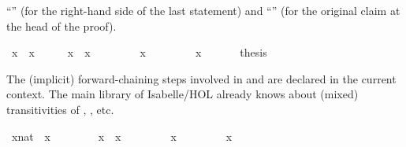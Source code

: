 \begin{isabellebody}
\begin{isamarkuptext}
  ``\isa{{\isasymdots}}'' (for the right-hand side of the last statement) and
  ``'' (for the original claim at the head of the
  proof).%
\end{isamarkuptext}%
\isamarkuptrue%
\ {\isachardoublequote}x{}\ {\isacharequal}\ x{}{\isachardoublequote}\isanewline
\isamarkupfalse%
\ {\isacharminus}\isanewline
\ \ \isamarkupfalse%
\ {\isachardoublequote}x{}\ {\isacharequal}\ x{}{\isachardoublequote}\ \isamarkupfalse%
\isanewline
\ \ \isamarkupfalse%
\ \isamarkupfalse%
\ {\isachardoublequote}{\isasymdots}\ {\isacharequal}\ x{}{\isachardoublequote}\ \isamarkupfalse%
\isanewline
\ \ \isamarkupfalse%
\ \isamarkupfalse%
\ {\isachardoublequote}{\isasymdots}\ {\isacharequal}\ x{}{\isachardoublequote}\ \isamarkupfalse%
\isanewline
\ \ \isamarkupfalse%
\ \isamarkupfalse%
\ {\isacharquery}thesis\ \isamarkupfalse%
\isacommand{{\isachardot}}\isanewline
\isamarkupfalse%
\isamarkupfalse%
%
\begin{isamarkuptext}%
The (implicit) forward-chaining steps involved in  and
   are declared in the current context.  The main library
  of Isabelle/HOL already knows about (mixed) transitivities of \isa{{\isacharequal}}, \isa{{\isacharless}}, \isa{{\isasymle}} etc.%
\end{isamarkuptext}%
\isamarkuptrue%
\ {\isachardoublequote}{\isacharparenleft}x{}{\isacharcolon}{\isacharcolon}nat{\isacharparenright}\ {\isacharless}\ x{}{\isachardoublequote}\isanewline
\ \ %
\isanewline
\isamarkupfalse%
\ {\isacharminus}\isanewline
\ \ \isamarkupfalse%
\ {\isachardoublequote}x{}\ {\isacharless}\ x{}{\isachardoublequote}\ \isamarkupfalse%
\isanewline
\ \ \isamarkupfalse%
\ \isamarkupfalse%
\ {\isachardoublequote}{\isasymdots}\ {\isasymle}\ x{}{\isachardoublequote}\ \isamarkupfalse%
\isanewline
\ \ \isamarkupfalse%
\ \isamarkupfalse%
\ {\isachardoublequote}{\isasymdots}\ {\isacharequal}\ x{}{\isachardoublequote}\ \isamarkupfalse%

\end{isabellebody}
